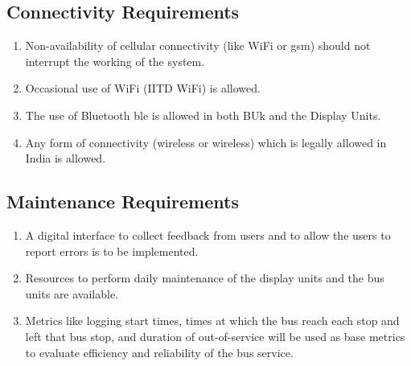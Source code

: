 \documentclass[12pt]{article} %
\begin{document}
\subsection{Connectivity Requirements}
    \begin{enumerate}
        \item Non-availability of cellular connectivity (like WiFi or \acrshort{gsm}) should not interrupt the working of the system.
        \item Occasional use of WiFi (IITD WiFi) is allowed.
        \item The use of Bluetooth \acrshort{ble} is allowed in both BUk and the Display Units. 
        \item Any form of connectivity  (wireless or wireless) which is legally allowed in India is allowed.
    \end{enumerate}
    
\subsection{Maintenance Requirements}
\begin{enumerate}
    \item A digital interface to collect feedback  from users and to allow the users to report errors is to be implemented. 
    \item Resources to perform daily maintenance of the display units and the bus units are available.  
    \item Metrics like logging start times, times at which the bus reach each stop and left that bus stop, and duration of out-of-service will be used as base metrics to evaluate efficiency and reliability of the bus service. 
\end{enumerate}



\clearpage
\end{document}
